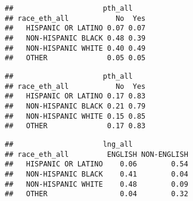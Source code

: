\documentclass[]{article}
\newenvironment{Shaded}{\begin{snugshade}}{\end{snugshade}}
\newcommand{\KeywordTok}[1]{\textcolor[rgb]{0.13,0.29,0.53}{\textbf{#1}}}
\newcommand{\DataTypeTok}[1]{\textcolor[rgb]{0.13,0.29,0.53}{#1}}
\newcommand{\DecValTok}[1]{\textcolor[rgb]{0.00,0.00,0.81}{#1}}
\newcommand{\StringTok}[1]{\textcolor[rgb]{0.31,0.60,0.02}{#1}}
\newcommand{\OperatorTok}[1]{\textcolor[rgb]{0.81,0.36,0.00}{\textbf{#1}}}
\newcommand{\NormalTok}[1]{#1}
\begin{document}
\begin{Shaded}
\end{Shaded}

\begin{verbatim}
##                     pth_all
## race_eth_all           No  Yes
##   HISPANIC OR LATINO 0.07 0.07
##   NON-HISPANIC BLACK 0.48 0.39
##   NON-HISPANIC WHITE 0.40 0.49
##   OTHER              0.05 0.05
\end{verbatim}

\begin{Shaded}
\end{Shaded}

\begin{verbatim}
##                     pth_all
## race_eth_all           No  Yes
##   HISPANIC OR LATINO 0.17 0.83
##   NON-HISPANIC BLACK 0.21 0.79
##   NON-HISPANIC WHITE 0.15 0.85
##   OTHER              0.17 0.83
\end{verbatim}

\begin{Shaded}
\end{Shaded}

\begin{verbatim}
##                     lng_all
## race_eth_all         ENGLISH NON-ENGLISH
##   HISPANIC OR LATINO    0.06        0.54
##   NON-HISPANIC BLACK    0.41        0.04
##   NON-HISPANIC WHITE    0.48        0.09
##   OTHER                 0.04        0.32
\end{verbatim}
\end{document}
